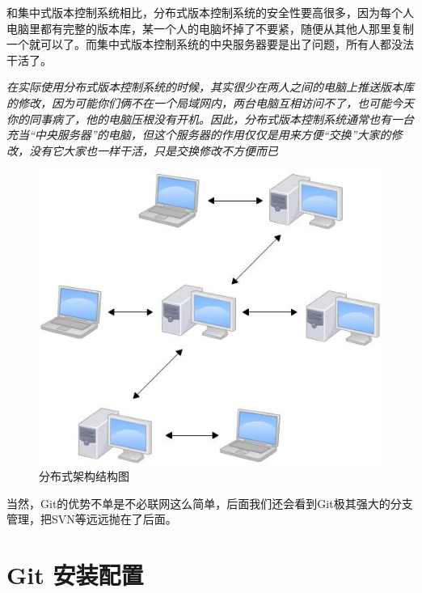 \documentclass[UTF8,a4paper,12pt]{ctexbook}
\begin{document}
		  和集中式版本控制系统相比，分布式版本控制系统的安全性要高很多，因为每个人电脑里都有完整的版本库，某一个人的电脑坏掉了不要紧，随便从其他人那里复制一个就可以了。而集中式版本控制系统的中央服务器要是出了问题，所有人都没法干活了。
		  
		  \textit{在实际使用分布式版本控制系统的时候，其实很少在两人之间的电脑上推送版本库的修改，因为可能你们俩不在一个局域网内，两台电脑互相访问不了，也可能今天你的同事病了，他的电脑压根没有开机。因此，分布式版本控制系统通常也有一台充当“中央服务器”的电脑，但这个服务器的作用仅仅是用来方便“交换”大家的修改，没有它大家也一样干活，只是交换修改不方便而已}
		  
		  \begin{figure}[h]
		  	\centering
		  	\includegraphics[scale = 0.7]{FenBuShi.jpg}
		  	\caption{分布式架构结构图}
		  \end{figure}
		  
		 当然，Git的优势不单是不必联网这么简单，后面我们还会看到Git极其强大的分支管理，把SVN等远远抛在了后面。
  \chapter{Git 安装配置}
  
\end{document}
